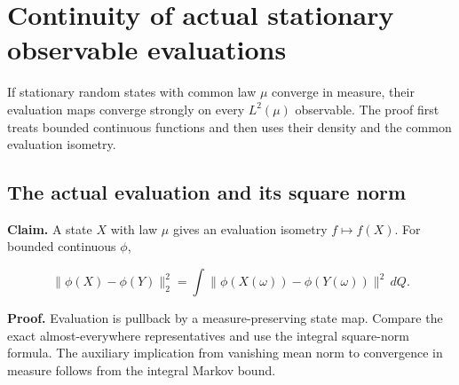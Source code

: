 \documentclass[11pt,a4paper]{report}
\begin{document}
\section{\texorpdfstring{Continuity of actual stationary observable evaluations}{Continuity of actual stationary observable evaluations}}
\label{proof-module-WassersteinMixing-SemigroupContinuity-lean}


If stationary random states with common law \(\mu\) converge in measure, their evaluation maps converge strongly on every \(L^2(\mu)\) observable. The proof first treats bounded continuous functions and then uses their density and the common evaluation isometry.

\subsection{\texorpdfstring{The actual evaluation and its square norm}{The actual evaluation and its square norm}}
\label{report-step-WassersteinMixing-SemigroupContinuity-lean-1}


\textbf{Claim.} A state \(X\) with law \(\mu\) gives an evaluation isometry \(f\mapsto f(X)\). For bounded continuous \(\phi\),

\[\|\phi(X)-\phi(Y)\|_2^2=\int\|\phi(X(\omega))-\phi(Y(\omega))\|^2\,dQ.\]

\textbf{Proof.} Evaluation is pullback by a measure-preserving state map. Compare the exact almost-everywhere representatives and use the integral square-norm formula. The auxiliary implication from vanishing mean norm to convergence in measure follows from the integral Markov bound.
\end{document}
